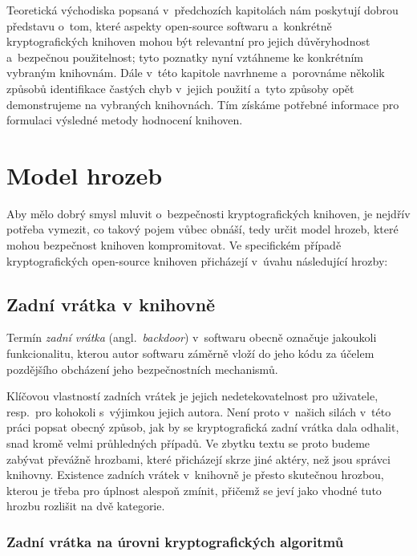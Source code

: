 \label{analyza}

Teoretická východiska popsaná v~předchozích kapitolách nám poskytují dobrou představu o~tom, které aspekty open-source softwaru a~konkrétně kryptografických knihoven mohou být re\-le\-vant\-ní pro jejich důvěryhodnost a~bezpečnou použitelnost; tyto poznatky nyní vztáhneme ke kon\-krét\-ním vybraným knihovnám. Dále v~této kapitole navrhneme a~porovnáme několik způsobů identifikace čas\-tých chyb v~jejich použití a~tyto způsoby opět demonstrujeme na vybraných knihovnách. Tím získáme potřebné informace pro formulaci výsledné metody hodnocení knihoven.

\section{Model hrozeb}

Aby mělo dobrý smysl mluvit o~bezpečnosti kryptografických knihoven, je nejdřív potřeba vymezit, co takový pojem vůbec obnáší, tedy určit model hrozeb, které mohou bezpečnost knihoven kompromitovat. Ve specifickém případě kryptografických open-source knihoven přicházejí v~úvahu následující hrozby:

\subsection{Zadní vrátka v knihovně}

Termín \emph{zadní vrátka} (angl.\ \emph{backdoor}) v~softwaru obecně označuje jakoukoli funkcionalitu, kterou autor softwaru záměrně vloží do jeho kódu za účelem pozdějšího obcházení jeho bezpečnostních mechanismů.

Klíčovou vlastností zadních vrátek je jejich nedetekovatelnost pro uživatele, resp.\ pro kohokoli s~výjimkou jejich autora. Není proto v~našich silách v~této práci popsat obecný způsob, jak by se kryptografická zadní vrátka dala odhalit, snad kromě velmi průhledných případů. Ve zbytku textu se proto budeme zabývat převážně hrozbami, které přicházejí skrze jiné aktéry, než jsou správci knihovny. Existence zadních vrátek v~knihovně je přesto skutečnou hrozbou, kterou je třeba pro úplnost alespoň zmínit, přičemž se jeví jako vhodné tuto hrozbu rozlišit na dvě kategorie.

\subsubsection{Zadní vrátka na úrovni kryptografických algoritmů}

